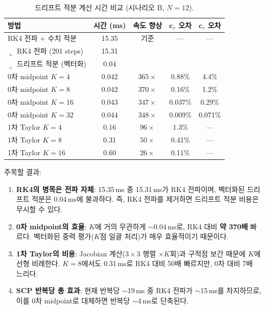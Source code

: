\documentclass[11pt]{article}
\begin{document}
\begin{table}[h]
\centering
\caption{드리프트 적분 계산 시간 비교 (시나리오 B, $N=12$).}
\label{tab:timing}
\small
\begin{tabular}{@{}lcccc@{}}
\toprule
방법 & 시간 (ms) & 속도 향상 & $\mathbf{c}_v$ 오차 & $\mathbf{c}_r$ 오차 \\
\midrule
RK4 전파 + 수치 적분 & 15.35 & 기준 & --- & --- \\
\quad $\llcorner$ RK4 전파 (201 steps)  & 15.31 & & & \\
\quad $\llcorner$ 드리프트 적분 (벡터화) & 0.04 & & & \\
\midrule
0차 midpoint $K=4$ & 0.042 & $365\times$ & 0.88\% & 4.4\% \\
0차 midpoint $K=8$ & 0.042 & $370\times$ & 0.16\% & 1.2\% \\
0차 midpoint $K=16$ & 0.043 & $347\times$ & 0.037\% & 0.29\% \\
0차 midpoint $K=32$ & 0.044 & $348\times$ & 0.009\% & 0.071\% \\
\midrule
1차 Taylor $K=4$ & 0.16 & $96\times$ & 1.3\% & --- \\
1차 Taylor $K=8$ & 0.31 & $50\times$ & 0.41\% & --- \\
1차 Taylor $K=16$ & 0.60 & $26\times$ & 0.11\% & --- \\
\bottomrule
\end{tabular}
\end{table}

주목할 결과:
\begin{enumerate}
  \item \textbf{RK4의 병목은 전파 자체}: 15.35\,ms 중 15.31\,ms가 RK4 전파이며,
        벡터화된 드리프트 적분은 0.04\,ms에 불과하다.
        즉, RK4 전파를 제거하면 드리프트 적분 비용은 무시할 수 있다.
  \item \textbf{0차 midpoint의 효율}: $K$에 거의 무관하게 $\sim$0.04\,ms로,
        RK4 대비 \textbf{약 370배} 빠르다.
        벡터화된 중력 평가($K$점 일괄 처리)가 매우 효율적이기 때문이다.
  \item \textbf{1차 Taylor의 비용}: Jacobian 계산($3\times 3$ 행렬 $\times K$회)과
        구적점 보간 때문에 $K$에 선형 비례한다.
        $K=8$에서도 0.31\,ms로 RK4 대비 50배 빠르지만,
        0차 대비 7배 느리다.
  \item \textbf{SCP 반복당 총 효과}: 현재 반복당 $\sim$19\,ms 중 RK4 전파가
        $\sim$15\,ms를 차지하므로,
        이를 0차 midpoint로 대체하면 반복당 $\sim$4\,ms로 단축된다.
\end{enumerate}
\end{document}
